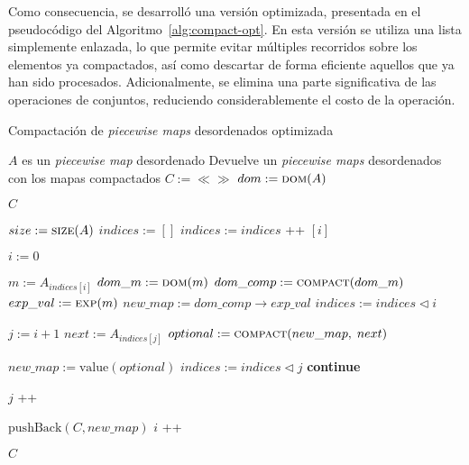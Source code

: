 Como consecuencia, se desarrolló una versión optimizada, presentada en el pseudocódigo del Algoritmo~\ref{alg:compact-opt}. En esta versión se utiliza una lista simplemente enlazada, lo que permite evitar múltiples recorridos sobre los elementos ya compactados, así como descartar de forma eficiente aquellos que ya han sido procesados. Adicionalmente, se elimina una parte significativa de las operaciones de conjuntos, reduciendo considerablemente el costo de la operación.

\begin{algorithm}
\caption{Compactación de \textit{piecewise maps} desordenados optimizada}
\label{alg:compact-opt}
\begin{algorithmic}[1]
\Require $A$ es un \textit{piecewise map} desordenado
\Ensure Devuelve un \textit{piecewise maps} desordenados con los mapas compactados
    \State $C := \ll\gg$
    \State $dom := \Call{dom}{A}$

        \State \Return $C$
    \EndIf

    \State $size := \Call{size}{A}$
    \State $indices := []$ 
        \State $indices := indices$  \!+\!+  $[i]$
    \EndFor
        
    \State $i := 0$
                
        \State $m := A_{indices[i]}$
        \State $dom\_m := \Call{dom}{m}$
        \State $dom\_comp := \Call{compact}{dom\_m}$
        \State $exp\_val := \Call{exp}{m}$
        \State $new\_map := dom\_comp \rightarrow exp\_val$
        \State $indices := indices \triangleleft  i$

        \State $j := i + 1$
            \State $next := A_{indices[j]}$
            \State $optional := \Call{compact}{new\_map,\;next}$

                \State $new\_map := \mathrm{value}(optional)$
                \State $indices := indices 	\triangleleft  j$
                \State \textbf{continue}
            \EndIf

            \State $j$ \!+\!+
        \EndWhile

        \State $\mathrm{pushBack}(C,new\_map)$
        \State $i$ \!+\!+
    \EndWhile

    \State \Return $C$
\EndFunction
\end{algorithmic}
\end{algorithm}

